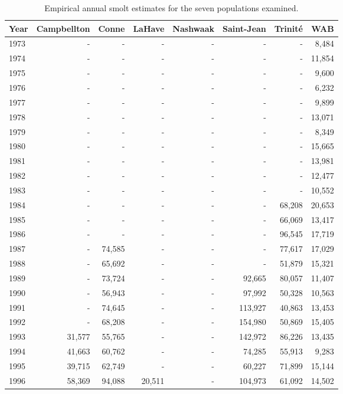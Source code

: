 \begingroup\footnotesize
\begin{longtable}{lrrrrrrr}
\caption{Empirical annual smolt estimates for the seven populations examined.} \\ 
  \hline
Year & Campbellton & Conne & LaHave & Nashwaak & Saint-Jean & Trinité & WAB \\ 
  \hline
1973 & - & - & - & - & - & - & 8,484 \\ 
  1974 & - & - & - & - & - & - & 11,854 \\ 
  1975 & - & - & - & - & - & - & 9,600 \\ 
  1976 & - & - & - & - & - & - & 6,232 \\ 
  1977 & - & - & - & - & - & - & 9,899 \\ 
  1978 & - & - & - & - & - & - & 13,071 \\ 
  1979 & - & - & - & - & - & - & 8,349 \\ 
  1980 & - & - & - & - & - & - & 15,665 \\ 
  1981 & - & - & - & - & - & - & 13,981 \\ 
  1982 & - & - & - & - & - & - & 12,477 \\ 
  1983 & - & - & - & - & - & - & 10,552 \\ 
  1984 & - & - & - & - & - & 68,208 & 20,653 \\ 
  1985 & - & - & - & - & - & 66,069 & 13,417 \\ 
  1986 & - & - & - & - & - & 96,545 & 17,719 \\ 
  1987 & - & 74,585 & - & - & - & 77,617 & 17,029 \\ 
  1988 & - & 65,692 & - & - & - & 51,879 & 15,321 \\ 
  1989 & - & 73,724 & - & - & 92,665 & 80,057 & 11,407 \\ 
  1990 & - & 56,943 & - & - & 97,992 & 50,328 & 10,563 \\ 
  1991 & - & 74,645 & - & - & 113,927 & 40,863 & 13,453 \\ 
  1992 & - & 68,208 & - & - & 154,980 & 50,869 & 15,405 \\ 
  1993 & 31,577 & 55,765 & - & - & 142,972 & 86,226 & 13,435 \\ 
  1994 & 41,663 & 60,762 & - & - & 74,285 & 55,913 & 9,283 \\ 
  1995 & 39,715 & 62,749 & - & - & 60,227 & 71,899 & 15,144 \\ 
  1996 & 58,369 & 94,088 & 20,511 & - & 104,973 & 61,092 & 14,502 \\ 

\end{longtable}
